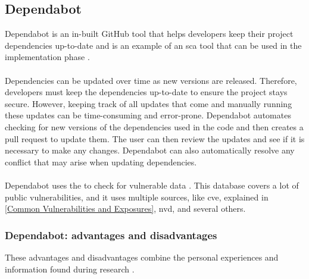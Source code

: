 \subsection{Dependabot}
Dependabot is an in-built GitHub tool that helps developers keep their project dependencies up-to-date and is an example of an \acrshort{sca} tool that can be used in the implementation phase \cite{GithubDependabot1}.
\\~\\
Dependencies can be updated over time as new versions are released. Therefore, developers must keep the dependencies up-to-date to ensure the project stays secure. However, keeping track of all updates that come and manually running these updates can be time-consuming and error-prone. Dependabot automates checking for new versions of the dependencies used in the code and then creates a pull request to update them. The user can then review the updates and see if it is necessary to make any changes. 
Dependabot can also automatically resolve any conflict that may arise when updating dependencies. 
\\~\\
Dependabot uses the  to check for vulnerable data \cite{GithubDependabot2}. This database covers a lot of public vulnerabilities, and it uses multiple sources, like \acrlong{cve}, explained in \ref{Common Vulnerabilities and Exposures}, \acrlong{nvd}, and several others.


\subsubsection{Dependabot: advantages and disadvantages}
These advantages and disadvantages combine the personal experiences and information found during research \cite{prosconsdependabot}. 

